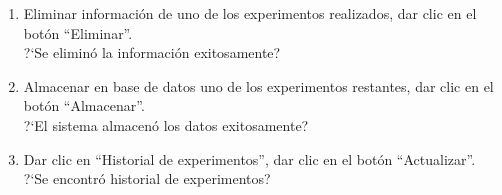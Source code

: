 \begin{enumerate}
{			?`Se realizó la actividad exitosamente?
	}
	\item {Eliminar información de uno de los experimentos realizados, dar clic en el botón ``Eliminar''.\\
			?`Se eliminó la información exitosamente?
	}
	\item {Almacenar en base de datos uno de los experimentos restantes, dar clic en el botón ``Almacenar''.\\
			?`El sistema almacenó los datos exitosamente?
	}

	\item {Dar clic en ``Historial de experimentos'', dar clic en el botón ``Actualizar''.\\
			?`Se encontró historial de experimentos?
	}
	

\end{enumerate}
